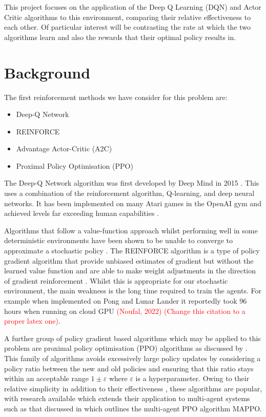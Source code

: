 \documentclass{article}
\begin{document}
This project focuses on the application of the Deep Q Learning (DQN) and Actor Critic algorithms to this environment, comparing their relative effectiveness to each other.
Of particular interest will be contrasting the rate at which the two algorithms learn and also the rewards that their optimal policy results in.

\section{Background} \label{Background}

The first reinforcement methods we have consider for this problem are:

\begin{itemize}
    \item Deep-Q Network
    \item REINFORCE
    \item Advantage Actor-Critic (A2C)
    \item Proximal Policy Optimisation (PPO)
\end{itemize}

The Deep-Q Network algorithm was first developed by Deep Mind in 2015 \citet{Mnih2015}.
This uses a combination of the reinforcement algorithm, Q-learning, and deep neural networks.
It has been implemented on many Atari games in the OpenAI gym and achieved levels far exceeding human capabilities \citet{Mnih2015}.

Algorithms that follow a value-function approach whilst performing well in some deterministic environments have been shown to be unable to converge to approximate a stochastic policy \citet{AdvanacesinNIPS}.
The REINFORCE algorithm is a type of policy gradient algorithm that provide unbiased estimates of gradient but without the learned value function and are able to make weight adjustments in the direction of gradient reinforcement \citet{Williams1992}.
Whilst this is appropriate for our stochastic environment, the main weakness is the long time required to train the agents. For example when implemented on Pong and Lunar Lander it reportedly took 96 hours when running on cloud GPU \textcolor{red}{(Noufal, 2022) (Change this citation to a proper latex one)}.

A further group of policy gradient based algorithms which may be applied to this problem are proximal policy optimisation (PPO) algorithms as discussed by \citet{PPOAlgo}.
This family of algorithms avoids excessively large policy updates by considering a policy ratio between the new and old policies and ensuring that this ratio stays within an acceptable range $1\pm\varepsilon$ where $\varepsilon$ is a hyperparameter.
Owing to their relative simplicity in addition to their effectiveness \citet{PPOmultiagentgames}, these algorithms are popular, with research available which extends their application to multi-agent systems such as that discussed in \citet{PPOAlgo} which outlines the multi-agent PPO algorithm MAPPO.
\end{document}
